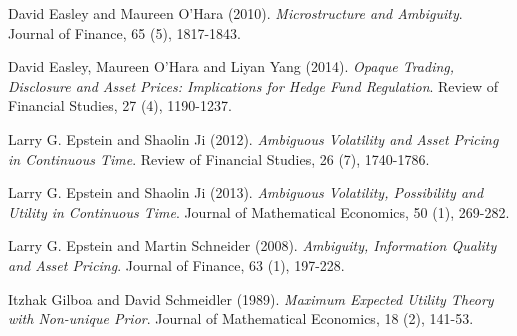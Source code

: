 \documentclass[10.0pt]{article}
\begin{document}
\begin{thebibliography}{99}
 David Easley and Maureen O'Hara (2010). {\it Microstructure and Ambiguity}. Journal of Finance, 65 (5), 1817-1843.

 David Easley, Maureen O'Hara and Liyan Yang (2014). {\it Opaque Trading, Disclosure and Asset Prices: Implications for Hedge Fund Regulation}. Review of Financial Studies, 27 (4), 1190-1237.



 Larry G. Epstein and Shaolin Ji (2012). {\it Ambiguous Volatility and Asset Pricing in Continuous Time}. Review of Financial Studies, 26 (7), 1740-1786.

 Larry G. Epstein and Shaolin Ji (2013). {\it Ambiguous Volatility, Possibility and Utility in Continuous Time}. Journal of Mathematical Economics, 50 (1), 269-282.

 Larry G. Epstein and Martin Schneider (2008). {\it Ambiguity, Information Quality and Asset Pricing}. Journal of Finance, 63 (1), 197-228.




 Itzhak Gilboa and David Schmeidler (1989). {\it Maximum Expected Utility Theory with Non-unique Prior}. Journal of
Mathematical Economics, 18 (2), 141-53.




\end{thebibliography}
\end{document}
